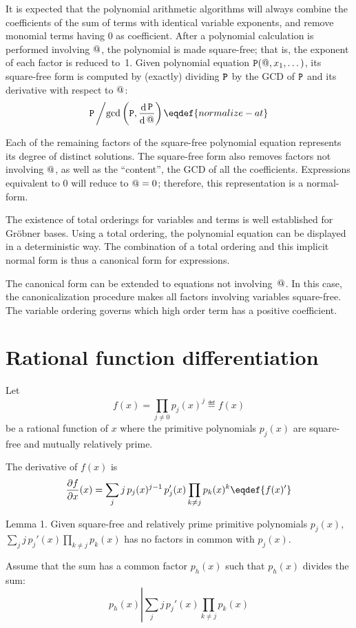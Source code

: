 It is expected that the polynomial arithmetic algorithms will always
combine the coefficients of the sum of terms with identical variable
exponents, and remove monomial terms having 0 as coefficient.  After a
polynomial calculation is performed involving ${@}$, the polynomial is
made square-free; that is, the exponent of each factor is reduced
to~1.  Given polynomial equation ${\tt{P}}({@},x_1,\dots)$, its
square-free form is computed by (exactly) dividing ${\tt{P}}$ by the
GCD of ${\tt{P}}$ and its derivative with respect to ${@}$:
$${{\tt{P}}\left/\gcd\left({\tt{P}},{\diff{\tt{P}}\over\diff\at}\right)\right.}\eqdef{normalize-at}$$

Each of the remaining factors of the square-free polynomial equation
represents its degree of distinct solutions.  The square-free form
also removes factors not involving ${@}$, as well as the ``content'',
the GCD of all the coefficients.  Expressions equivalent to 0 will
reduce to ${@}=0$; therefore, this representation is a normal-form.

The existence of total orderings for variables and terms is well
established for Gr\"obner bases.  Using a total ordering, the
polynomial equation can be displayed in a deterministic way.  The
combination of a total ordering and this implicit normal form is thus
a canonical form for expressions.

The canonical form can be extended to equations not involving~${@}$.
In this case, the canonicalization procedure makes all factors
involving variables square-free.  The variable ordering governs which
high order term has a positive coefficient.

\section{Rational function differentiation}

Let
$$f(x)=\prod_{j\ne0} p_j(x)^j\eqdef{f(x)}$$
be a rational function of $x$ where the primitive polynomials $p_j(x)$
are square-free and mutually relatively prime.

The derivative of $f(x)$ is
$${\partial{f}\over \partial{x}}(x)=\sum_{j} j\,p_j(x)^{j-1}\,{p_j'}(x)\prod_{k\neq j}p_k(x)^k
  \eqdef{f(x)'}$$

\proclaim Lemma 1. {
Given square-free and relatively prime primitive polynomials $p_j(x)$,
$\sum_{j}j\,{p_j'}(x)\prod_{k\neq j}p_k(x)$ has no factors in common
with $p_j(x)$.}\par

Assume that the sum has a common factor $p_h(x)$ such that $p_h(x)$
divides the sum:
$$p_h(x)\left|\sum_{j}j\,{p_j'}(x)\prod_{k\neq j}p_k(x)\right.$$

